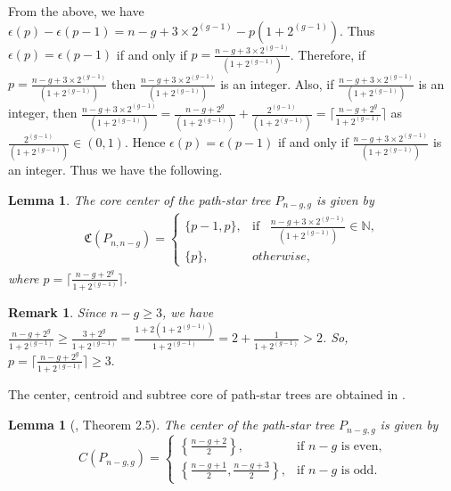 \documentclass[11pt]{article}
\newtheorem{lemma}[theorem]{Lemma}
\newtheorem{remark}[theorem]{Remark}
\begin{document}
From the above, we have $ \epsilon(p)-\epsilon(p-1)=n-g+3\times 2^{(g-1)}-p(1+2^{(g-1)})$. Thus 
$\epsilon(p)=\epsilon(p-1)$ if and only if $p=\frac{n-g+3\times 2^{(g-1)}}{(1+2^{(g-1)})}$. Therefore, if $p=\frac{n-g+3\times 2^{(g-1)}}{(1+2^{(g-1)})}$ then $\frac{n-g+3\times 2^{(g-1)}}{(1+2^{(g-1)})}$ is an integer. Also, if $\frac{n-g+3\times 2^{(g-1)}}{(1+2^{(g-1)})}$ is an integer, then $\frac{n-g+3\times2^{(g-1)}}{(1+2^{(g-1)})}=  \frac{n-g+2^{g}}{(1+2^{(g-1)})}+\frac{2^{(g-1)}}{(1+2^{(g-1)})}= \lceil \frac{n-g+2^g}{1+2^{(g-1)}}\rceil$ as $\frac{2^{(g-1)}}{(1+2^{(g-1)})}\in(0,1)$. Hence $\epsilon(p)=\epsilon(p-1)$ if and only if $\frac{n-g+3\times 2^{(g-1)}}{(1+2^{(g-1)})}$ is an integer. Thus we have the following.

\begin{lemma}\label{lem2.1}
The core center of the path-star tree $P_{n-g,g}$ is given by 
\begin{align*}
    \mathfrak{C}(P_{n,n-g})=\begin{cases}
   \{p-1,p\},& \text{if}\;\;\; \frac{n-g+3\times 2^{(g-1)}}{(1+2^{(g-1)})}\in \mathbb{N},\\
   \{p\},& otherwise,
    \end{cases}
\end{align*}
where  $p=\lceil \frac{n-g+2^g}{1+2^{(g-1)}} \rceil.$
\end{lemma}
\begin{remark}\label{rem:p}
Since $n-g\geq 3$, we have $\frac{n-g+2^g}{1+2^{(g-1)}}\geq \frac{3+2^g}{1+2^{(g-1)}}=\frac{1+2(1+2^{(g-1)})}{1+2^{(g-1)}}=2+\frac{1}{1+2^{(g-1)}}>2$. So, $p=\lceil \frac{n-g+2^g}{1+2^{(g-1)}} \rceil\geq 3.$
\end{remark}

The center, centroid and subtree core of path-star trees are obtained in \cite{Des}.
\begin{lemma}[\cite{Des}, Theorem 2.5]\label{lem2.2}
The center of the path-star tree $P_{n-g, g}$ is given by
\begin{equation*}
C(P_{n - g, g}) =
\begin{cases}
\left\{\frac{n - g + 2}{2}\right\}, &\text{if $n - g$ is even,}\\
\left\{\frac{n - g + 1}{2}, \frac{n - g + 3}{2}\right\}, &\text{if $n - g$ is odd.}
\end{cases}
\end{equation*}
\end{lemma}
\end{document}
